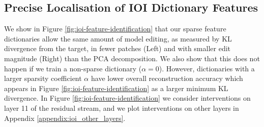 \subsection{Precise Localisation of IOI Dictionary Features}

We show in Figure \ref{fig:ioi-feature-identification} that our sparse feature dictionaries allow the same amount of model editing, as measured by KL divergence from the target, in fewer patches (Left) and with smaller edit magnitude (Right) than the PCA decomposition. We also show that this does not happen if we train a non-sparse dictionary ($\alpha=0$). However, dictionaries with a larger sparsity coefficient $\alpha$ have lower overall reconstruction accuracy which appears in Figure \ref{fig:ioi-feature-identification} as a larger minimum KL divergence. In Figure \ref{fig:ioi-feature-identification} we consider interventions on layer 11 of the residual stream, and we plot interventions on other layers in Appendix \ref{appendix:ioi_other_layers}.

